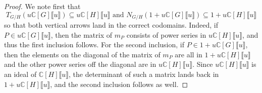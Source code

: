 \documentclass[11pt]{amsart}
\numberwithin{equation}{section}
\theoremstyle{remark}
\theoremstyle{definition}
\begin{document}
\begin{proof}
We note first that
$$T_{G/H}(u\mathbb{C}[G] \llbracket u \rrbracket) \subseteq u \mathbb{C}[H]\llbracket u \rrbracket \text{ and } N_{G/H}(1+u\mathbb{C}[G]\llbracket u \rrbracket) \subseteq 1 + u \mathbb{C}[H]\llbracket u \rrbracket$$
so that both vertical arrows land in the correct codomains.  Indeed, if $P \in u \mathbb{C}[G]\llbracket u \rrbracket$, then the matrix of $m_{P}$ consists of power series in $u \mathbb{C}[H]\llbracket u \rrbracket$, and thus the first inclusion follows.  For the second inclusion, if $P \in 1 + u \mathbb{C}[G]\llbracket u \rrbracket$, then the elements on the diagonal of the matrix of $m_{P}$ are all in $1 + u \mathbb{C}[H]\llbracket u \rrbracket$ and the other power series off the diagonal are in $u \mathbb{C}[H]\llbracket u \rrbracket$.  Since $u \mathbb{C}[H]\llbracket u \rrbracket$ is an ideal of $\mathbb{C}[H]\llbracket u \rrbracket$, the determinant of such a matrix lands back in $1 + u\mathbb{C}[H]\llbracket u \rrbracket$, and the second inclusion follows as well.


\end{proof}
\end{document}
